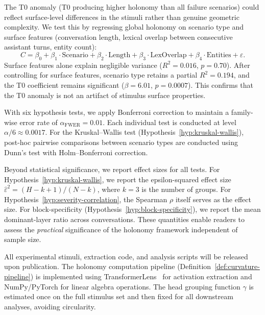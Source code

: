 \begin{remark}
\label{rem:t0-separability}
The T0 anomaly (T0 producing higher holonomy than all failure scenarios) could
reflect surface-level differences in the stimuli rather than genuine geometric
complexity. We test this by regressing global holonomy on scenario type and
surface features (conversation length, lexical overlap between consecutive
assistant turns, entity count):
\[
    C = \beta_0 + \beta_1 \cdot \text{Scenario} + \beta_2 \cdot \text{Length}
    + \beta_3 \cdot \text{LexOverlap} + \beta_4 \cdot \text{Entities} + \varepsilon.
\]
Surface features alone explain negligible variance ($R^2 = 0.016$, $p = 0.70$).
After controlling for surface features, scenario type retains a partial $R^2 =
0.194$, and the T0 coefficient remains significant ($\beta = 6.01$, $p = 0.0007$).
This confirms that the T0 anomaly is not an artifact of stimulus surface properties.
\end{remark}

\begin{remark}
\label{rem:multiple-comparisons}
With six hypothesis tests, we apply Bonferroni correction to maintain a family-wise error
rate of $\alpha_{\mathrm{FWER}} = 0.01$. Each individual test is conducted at level
$\alpha / 6 \approx 0.0017$. For the Kruskal--Wallis test (Hypothesis~\ref{hyp:kruskal-wallis}),
post-hoc pairwise comparisons between scenario types are conducted using Dunn's test with
Holm--Bonferroni correction.
\end{remark}

\begin{remark}
\label{rem:effect-sizes}
Beyond statistical significance, we report effect sizes for all tests. For
Hypothesis~\ref{hyp:kruskal-wallis}, we report the epsilon-squared effect size
$\hat{\varepsilon}^2 = (H - k + 1) / (N - k)$, where $k = 3$ is the number of groups.
For Hypothesis~\ref{hyp:severity-correlation}, the Spearman $\rho$ itself serves as the
effect size. For block-specificity (Hypothesis~\ref{hyp:block-specificity}), we report
the mean dominant-layer ratio across conversations. These quantities enable readers to
assess the \emph{practical} significance of the holonomy framework independent of sample
size.
\end{remark}

\begin{remark}[Reproducibility]
\label{rem:reproducibility}
All experimental stimuli, extraction code, and analysis scripts will be released upon
publication. The holonomy computation pipeline (Definition~\ref{def:curvature-pipeline})
is implemented using TransformerLens~\cite{nanda2023transformerlens} for activation
extraction and NumPy/PyTorch for linear algebra operations. The head grouping function
$\gamma$ is estimated once on the full stimulus set and then fixed for all downstream
analyses, avoiding circularity.
\end{remark}
